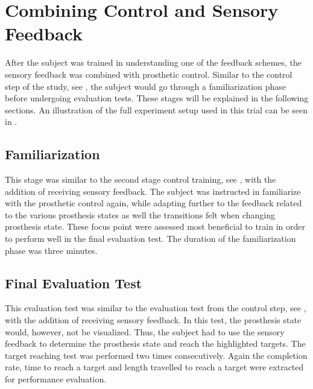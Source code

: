 \section{Combining Control and Sensory Feedback}
After the subject was trained in understanding one of the feedback schemes, the sensory feedback was combined with prosthetic control. Similar to the control step of the study, see , the subject would go through a familiarization phase before undergoing evaluation tests.  These stages will be explained in the following sections. An illustration of the full experiment setup used in this trial can be seen in .

\subsection{Familiarization}
This stage was similar to the second stage control training, see , with the addition of receiving sensory feedback. The subject was instructed in familiarize with the prosthetic control again, while adapting further to the feedback related to the various prosthesis states as well the transitions felt when changing prosthesis state. These focus point were assessed most beneficial to train in order to perform well in the final evaluation test. The duration of the familiarization phase was three minutes.

\subsection{Final Evaluation Test}
This evaluation test was similar to the evaluation test from the control step, see , with the addition of receiving sensory feedback. In this test, the prosthesis state would, however, not be visualized. Thus, the subject had to use the sensory feedback to determine the prosthesis state and reach the highlighted targets. The target reaching test was performed two times consecutively. Again the completion rate, time to reach a target and length travelled to reach a target were extracted for performance evaluation.

